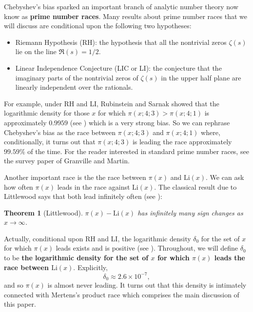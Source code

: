\documentclass[12pt,reqno]{amsart}
\newtheorem{theorem}{Theorem}[section]
\theoremstyle{definition}
\numberwithin{equation}{section}
\begin{document}
    Chebyshev's bias sparked an important branch of analytic number theory now know as \textbf{prime number races}. Many results about prime number races that we will discuss are conditional upon the following two hypotheses:
    \begin{itemize}
        \item Riemann Hypothesis (RH): the hypothesis that all the nontrivial zeros $\zeta(s)$ lie on the line $\Re(s) = 1/2$.
        \item Linear Independence Conjecture (LIC or LI): the conjecture that the imaginary parts of the nontrivial zeros of $\zeta(s)$ in the upper half plane are linearly independent over the rationals.
    \end{itemize}
    
    For example, under RH and LI, Rubinstein and Sarnak showed that the logarithmic density for those $x$ for which $ \pi(x;4;3) > \pi(x;4;1)$ is approximately $0.9959$ (see \cite{RS}) which is a very strong bias. So we can rephrase Chebyshev's bias as the race between $\pi(x;4;3)$ and $\pi(x;4;1)$ where, conditionally, it turns out that $\pi(x;4;3)$ is leading the race approximately $99.59\%$ of the time. For the reader interested in standard prime number races, see the survey paper \cite{GM} of Granville and Martin. 
    
    Another important race is the the race between $\pi(x)$ and $\mathrm{Li}(x)$. We can ask how often $\pi(x)$ leads in the race against $\mathrm{Li}(x)$. The classical result due to Littlewood says that both lead infinitely often (see \cite{L}):

    \begin{theorem}[Littlewood]\label{thm:Littlewood_sign_change_result}
        $\pi(x)-\mathrm{Li}(x)$ has infinitely many sign changes as $x \to \infty$.
    \end{theorem}

    Actually, conditional upon RH and LI, the logarithmic density $\delta_{0}$ for the set of $x$ for which $\pi(x)$ leads exists and is positive (see \cite{LMP}). Throughout, we will define $\delta_{0}$ to be \textbf{the logarithmic density for the set of $x$ for which $\pi(x)$ leads the race between $\mathrm{Li}(x)$}. Explicitly,
    \begin{equation}\label{equ:approx_form_for_delta_zero}
        \delta_{0} \approx 2.6\times10^{-7},
    \end{equation}
    and so $\pi(x)$ is almost never leading. It turns out that this density is intimately connected with Mertens's product race which comprises the main discussion of this paper.
\end{document}
